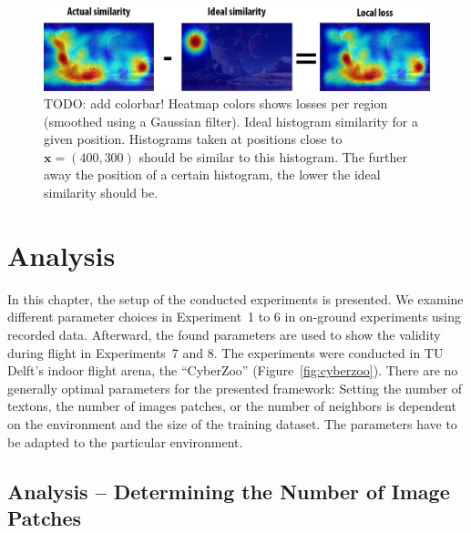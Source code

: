 \documentclass{report}
\begin{document}
\begin{figure}[h!]
\begin{center}
\includegraphics[width=1\columnwidth]{local_loss}
\caption{{TODO: add colorbar! Heatmap colors shows losses per region
    (smoothed using a Gaussian filter). Ideal histogram similarity for
    a given position. Histograms taken at positions close to
    $\textbf{x} = (400, 300)$ should be similar to this histogram. The
    further away the position of a certain histogram, the lower the
    ideal similarity should be.%
  }}
\end{center}
\end{figure}

\chapter{Analysis}
\label{chap:analysis}

In this chapter, the setup of the conducted experiments is
presented. We examine different parameter choices in Experiment~1 to 6
in on-ground experiments using recorded data. Afterward, the found
parameters are used to show the validity during flight in
Experiments~7 and 8. The experiments were conducted in TU Delft's
indoor flight arena, the ``CyberZoo''
(Figure~\ref{fig:cyberzoo}).
%
There are no generally optimal parameters for the presented framework:
Setting the number of textons, the number of images patches, or the
number of neighbors is dependent on the environment and the size of the
training dataset. The parameters have to be adapted to the particular
environment.

\section{Analysis -- Determining the Number of Image Patches}
\label{sec:numtextons}
\end{document}
